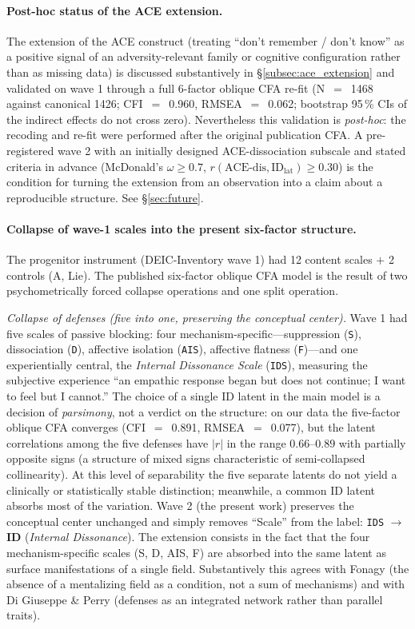 \paragraph{Post-hoc status of the ACE extension.} The extension of the ACE construct (treating ``don't remember / don't know'' as a positive signal of an adversity-relevant family or cognitive configuration rather than as missing data) is discussed substantively in §\ref{subsec:ace_extension} and validated on wave 1 through a full 6-factor oblique CFA re-fit (N~$=$~1468 against canonical 1426; CFI~$=$~0.960, RMSEA~$=$~0.062; bootstrap 95\,\% CIs of the indirect effects do not cross zero). Nevertheless this validation is \emph{post-hoc}: the recoding and re-fit were performed after the original publication CFA. A pre-registered wave 2 with an initially designed ACE-dissociation subscale and stated criteria in advance (McDonald's $\omega \ge 0.7$, $r(\text{ACE-dis}, \text{ID}_{\mathrm{lat}}) \ge 0.30$) is the condition for turning the extension from an observation into a claim about a reproducible structure. See §\ref{sec:future}.

\paragraph{Collapse of wave-1 scales into the present six-factor structure.} The progenitor instrument (DEIC-Inventory wave 1) had 12 content scales $+$ 2 controls (A, Lie). The published six-factor oblique CFA model is the result of two psychometrically forced collapse operations and one split operation.

\emph{Collapse of defenses (five into one, preserving the conceptual center).} Wave 1 had five scales of passive blocking: four mechanism-specific---suppression (\texttt{S}), dissociation (\texttt{D}), affective isolation (\texttt{AIS}), affective flatness (\texttt{F})---and one experientially central, the \emph{Internal Dissonance Scale} (\texttt{IDS}), measuring the subjective experience ``an empathic response began but does not continue; I want to feel but I cannot.'' The choice of a single ID latent in the main model is a decision of \emph{parsimony}, not a verdict on the structure: on our data the five-factor oblique CFA converges (CFI~$=$~0.891, RMSEA~$=$~0.077), but the latent correlations among the five defenses have $|r|$ in the range $0.66$--$0.89$ with partially opposite signs (a structure of mixed signs characteristic of semi-collapsed collinearity). At this level of separability the five separate latents do not yield a clinically or statistically stable distinction; meanwhile, a common ID latent absorbs most of the variation. Wave 2 (the present work) preserves the conceptual center unchanged and simply removes ``Scale'' from the label: \texttt{IDS} $\to$ \textbf{ID} (\emph{Internal Dissonance}). The extension consists in the fact that the four mechanism-specific scales (S, D, AIS, F) are absorbed into the same latent as surface manifestations of a single field. Substantively this agrees with Fonagy (the absence of a mentalizing field as a condition, not a sum of mechanisms) and with Di Giuseppe \& Perry \citep{digiuseppe2024} (defenses as an integrated network rather than parallel traits).

